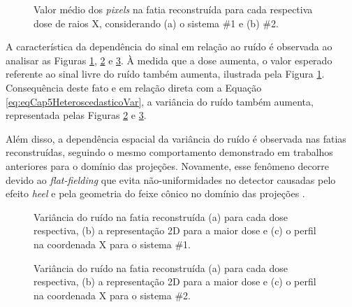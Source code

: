 \begin{figure}[htb]
	\centering
	\caption{Valor médio dos \textit{pixels} na fatia reconstruída para cada respectiva dose de raios X, considerando (a) o sistema \#1 e (b) \#2.}
	
	\label{fig:imgCap6Means}
\end{figure}

A característica da dependência do sinal em relação ao ruído é observada ao analisar as Figuras \ref{fig:imgCap6Means}, \ref{fig:imgCap6GE_Var} e \ref{fig:imgCap6HO_Var}. À medida que a dose aumenta, o valor esperado referente ao sinal livre do ruído também aumenta, ilustrada pela Figura \ref{fig:imgCap6Means}. Consequência deste fato e em relação direta com a Equação \ref{eq:eqCap5HeteroscedasticoVar}, a variância do ruído também aumenta, representada pelas Figuras \ref{fig:imgCap6GE_Var} e \ref{fig:imgCap6HO_Var}.

Além disso, a dependência espacial da variância do ruído é observada nas fatias reconstruídas, seguindo o mesmo comportamento demonstrado em trabalhos anteriores para o domínio das projeções. Novamente, esse fenômeno decorre devido ao \textit{flat-fielding} que evita não-uniformidades no detector causadas pelo efeito \textit{heel} e pela geometria do feixe cônico no domínio das projeções \cite{borges2017pipeline,borges2017method, borges2018restoration,brito2018application,guerrero2018}.

\begin{figure}[htb]
	\centering
	\caption{Variância do ruído na fatia reconstruída (a) para cada dose respectiva, (b) a representação \acs{2D} para a maior dose e (c) o perfil na coordenada X para o sistema \#1.}

	\hfill
	\label{fig:imgCap6GE_Var}
\end{figure}

\begin{figure}[htb]
	\centering
	\caption{Variância do ruído na fatia reconstruída (a) para cada dose respectiva, (b) a representação \acs{2D} para a maior dose e (c) o perfil na coordenada X para o sistema \#2.}
	
	\hfil
	\label{fig:imgCap6HO_Var}
\end{figure}

